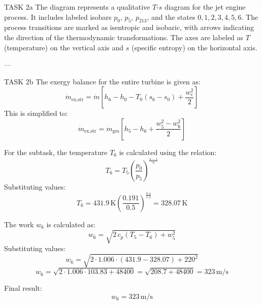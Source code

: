 TASK 2a  
The diagram represents a qualitative \( T \)-\( s \) diagram for the jet engine process. It includes labeled isobars \( p_0 \), \( p_5 \), \( p_{213} \), and the states \( 0, 1, 2, 3, 4, 5, 6 \). The process transitions are marked as isentropic and isobaric, with arrows indicating the direction of the thermodynamic transformations. The axes are labeled as \( T \) (temperature) on the vertical axis and \( s \) (specific entropy) on the horizontal axis.  

---

TASK 2b  
The exergy balance for the entire turbine is given as:  
\[
\dot{m}_{\text{ex,str}} = \dot{m} \left[ h_6 - h_0 - T_0 (s_6 - s_0) + \frac{w_e^2}{2} \right]
\]  
This is simplified to:  
\[
\dot{m}_{\text{ex,str}} = \dot{m}_{\text{ges}} \left[ h_5 - h_6 + \frac{w_5^2 - w_6^2}{2} \right]
\]  

For the subtask, the temperature \( T_6 \) is calculated using the relation:  
\[
T_6 = T_5 \left( \frac{p_0}{p_5} \right)^{\frac{\kappa - 1}{\kappa}}
\]  
Substituting values:  
\[
T_6 = 431.9 \, \text{K} \left( \frac{0.191}{0.5} \right)^{\frac{0.4}{1.4}} = 328.07 \, \text{K}
\]  

The work \( w_6 \) is calculated as:  
\[
w_6 = \sqrt{2 \, c_p (T_5 - T_6) + w_5^2}
\]  
Substituting values:  
\[
w_6 = \sqrt{2 \cdot 1.006 \cdot (431.9 - 328.07) + 220^2}
\]  
\[
w_6 = \sqrt{2 \cdot 1.006 \cdot 103.83 + 48400} = \sqrt{208.7 + 48400} = 323 \, \text{m/s}
\]  

Final result:  
\[
w_6 = 323 \, \text{m/s}
\]